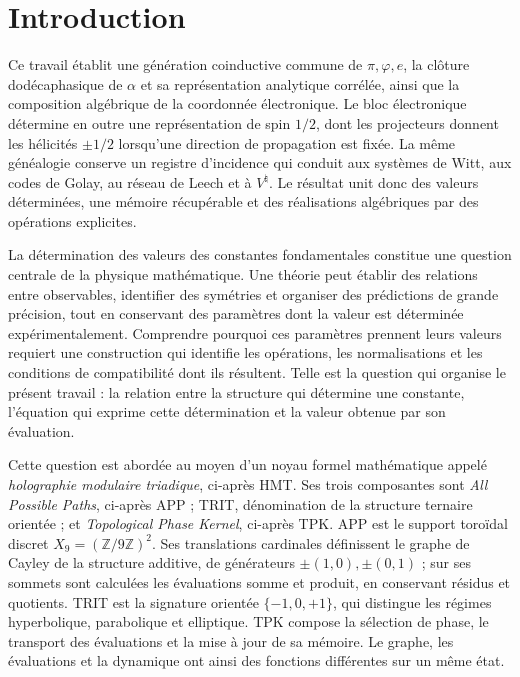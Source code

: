 \section{Introduction}
\label{sec:introduccion}

Ce travail établit une génération coinductive commune de
\(\pi,\varphi,e\), la clôture dodécaphasique de \(\alpha\) et sa
représentation analytique corrélée, ainsi que la composition algébrique de
la coordonnée électronique. Le bloc électronique détermine en outre une
représentation de spin \(1/2\), dont les projecteurs donnent les hélicités
\(\pm1/2\) lorsqu'une direction de propagation est fixée. La même généalogie
conserve un registre d'incidence qui conduit aux systèmes de Witt,
aux codes de Golay, au réseau de Leech et à \(V^\natural\). Le
résultat unit donc des valeurs déterminées, une mémoire récupérable et des
réalisations algébriques par des opérations explicites.

La détermination des valeurs des constantes fondamentales constitue une
question centrale de la physique mathématique. Une théorie peut établir des relations
entre observables, identifier des symétries et organiser des prédictions de grande précision,
tout en conservant des paramètres dont la valeur est déterminée expérimentalement.
Comprendre pourquoi ces paramètres prennent leurs valeurs requiert une construction
qui identifie les opérations, les normalisations et les conditions de
compatibilité dont ils résultent. Telle est la question qui organise le présent
travail : la relation entre la structure qui détermine une constante, l'équation
qui exprime cette détermination et la valeur obtenue par son évaluation.

Cette question est abordée au moyen d'un noyau formel mathématique appelé
\emph{holographie modulaire triadique}, ci-après HMT. Ses trois composantes sont
\emph{All Possible Paths}, ci-après APP ; TRIT, dénomination de la structure
ternaire orientée ; et \emph{Topological Phase Kernel}, ci-après TPK.
APP est le support toroïdal discret \(X_9=(\mathbb Z/9\mathbb Z)^2\).
Ses translations cardinales définissent le graphe de Cayley de la structure
additive, de générateurs \(\pm(1,0),\pm(0,1)\) ; sur ses sommets
sont calculées les évaluations somme et produit, en conservant résidus et
quotients. TRIT est la signature orientée \(\{-1,0,+1\}\), qui distingue
les régimes hyperbolique, parabolique et elliptique. TPK compose la sélection
de phase, le transport des évaluations et la mise à jour de sa
mémoire. Le graphe, les évaluations et la dynamique ont ainsi des fonctions
différentes sur un même état.

